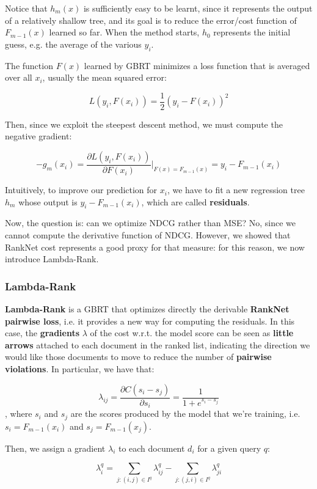 Notice that $h_m(x)$ is sufficiently easy to be learnt, since it represents the output of a relatively shallow tree, and its goal is to reduce the error/cost function of $F_{m-1}(x)$ learned so far. When the method starts, $h_0$ represents the initial guess, e.g. the average of the various $y_i$.

The function $F(x)$ learned by GBRT minimizes a loss function that is averaged over all $x_i$, usually the mean squared error:

$$
L(y_i,F(x_i)) = \frac{1}{2} (y_i - F(x_i))^2
$$

Then, since we exploit the steepest descent method, we must compute the negative gradient:

$$
- g_m(x_i) = \frac{\partial L(y_i, F(x_i))}{\partial F(x_i)}|_{F(x) = F_{m-1}(x)} = y_i - F_{m-1}(x_i)
$$

Intuitively, to improve our prediction for $x_i$, we have to fit a new regression tree $h_m$ whose output is $y_i - F_{m-1}(x_i)$, which are called \textbf{residuals}.

Now, the question is: can we optimize NDCG rather than MSE? No, since we cannot compute the derivative function of NDCG. However, we showed that RankNet cost represents a good proxy for that measure: for this reason, we now introduce Lambda-Rank.

\subsubsection{Lambda-Rank}
\textbf{Lambda-Rank} is a GBRT that optimizes directly the derivable \textbf{RankNet pairwise loss}, i.e. it provides a new way for computing the residuals. In this case, the \textbf{gradients} $\lambda$ of the cost w.r.t. the model score can be seen as \textbf{little arrows} attached to each document in the ranked list, indicating the direction we would like those documents to move to reduce the number of \textbf{pairwise violations}. In particular, we have that:

$$
\lambda_{ij} = \frac{\partial C(s_i - s_j)}{\partial s_i} = \frac{1}{1 + e^{s_i - s_j}}
$$
, where $s_i$ and $s_j$ are the scores produced by the model that we're training, i.e. $s_i = F_{m-1}(x_i)$ and $s_j = F_{m-1}(x_j)$.

Then, we assign a gradient $\lambda_i$ to each document $d_i$ for a given query $q$:

$$
\lambda_i^q = \sum_{j:(i,j) \in I^q} \lambda_{ij}^q - \sum_{j:(j,i) \in I^q} \lambda_{ji}^q
$$

